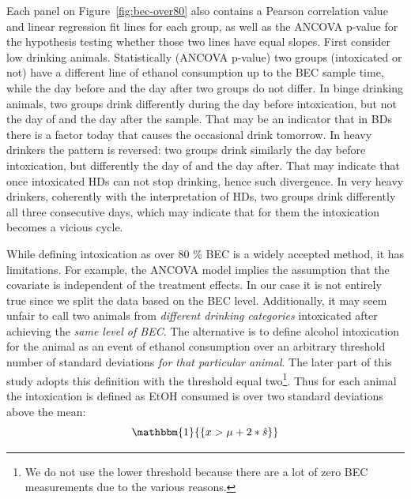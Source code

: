 	Each panel on Figure~\ref{fig:bec-over80} also contains a Pearson correlation value and linear regression fit lines for each group, as well as the ANCOVA p-value for the hypothesis testing whether those two lines have equal slopes. First consider low drinking animals. Statistically (ANCOVA p-value) two groups (intoxicated or not) have a different line of ethanol consumption up to the BEC sample time, while the day before and the day after two groups do not differ. In binge drinking animals, two groups drink differently during the day before intoxication, but not the day of and the day after the sample. That may be an indicator that in BDs there is a factor today that causes the occasional drink tomorrow. In heavy drinkers the pattern is reversed: two groups drink similarly the day before intoxication, but differently the day of and the day after. That may indicate that once intoxicated HDs can not stop drinking, hence such divergence. In very heavy drinkers, coherently with the interpretation of HDs, two groups drink differently all three consecutive days, which may indicate that for them the intoxication becomes a vicious cycle. 

	While defining intoxication as over 80 \% BEC is a widely accepted method, it has limitations. For example, the ANCOVA model implies the assumption that the covariate is independent of the treatment effects. In our case it is not entirely true since we split the data based on the BEC level. Additionally, it may seem unfair to call two animals from \textit{different drinking categories} intoxicated after achieving the \textit{same level of BEC}. The alternative is to define alcohol intoxication for the animal as an event of ethanol consumption over an arbitrary threshold number of standard deviations \textit{for that particular animal}. The later part of this study adopts this definition with the threshold equal two\footnote{We do not use the lower threshold because there are a lot of zero BEC measurements due to the various reasons.}. Thus for each animal the intoxication is defined as EtOH consumed is over two standard deviations above the mean:
	\begin{equation} \label{eq:intox-std}
	\mathbbm{1}{ \{x > \mu + 2*\hat{s}\}}
	\end{equation} 
	
